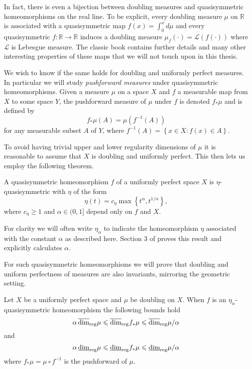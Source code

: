 In fact, there is even a bijection between doubling measures and quasisymmetric homeomorphisms on the real line. To be explicit, every doubling measure $\mu$ on $\mathbb{R}$ is associated with a quasisymmetric map $f(x) = \int_{0}^{x}d\mu$ and every quasisymmetric $f \colon \mathbb{R} \rightarrow \mathbb{R}$ induces a doubling measure $\mu_f( \cdot ) = \mathcal{L}(f(\cdot)) $ where $\mathcal{L}$ is Lebesgue measure. The classic book \cite{heinonen} contains further details and many other interesting properties of these maps that we will not touch upon in this thesis.

We wish to know if the same holds for doubling and uniformly perfect measures. In particular we will study \textit{pushforward measures} under quasisymmetric homeomorphisms. Given a measure $\mu$ on a space $X$ and $f$ a measurable map from $X$ to some space $Y$, the pushforward measure of $\mu$ under $f$ is denoted $f_*\mu$ and is defined by
\[
f_*\mu (A) = \mu(f^{-1}(A))
\]
for any measurable subset $A$ of $Y$, where $f^{-1}(A) = \left\{x \in X \colon f(x) \in A \right\}$. 

To avoid having trivial upper and lower regularity dimensions of $\mu$ it is reasonable to assume that $X$ is doubling and uniformly perfect. This then lets us employ the following theorem. 

\begin{theorem}\label{ch-quantifying:heinonen-quasisymm}
	A quasisymmetric homeomorphism $f$ of a uniformly perfect space $X$ is $\eta$-quasisymmetric with $\eta$ of the form
	\[
	\eta(t) = c_\eta \max\left\{t^\alpha, t^{1/\alpha}\right\},
	\]
	where $c_\eta \ge 1 $ and $\alpha \in (0,1]$ depend only on $f$ and $X$.
\end{theorem}
For clarity we will often write $\eta_{\alpha}$ to indicate the homeomorphism $\eta$ associated with the constant $\alpha$ as described here. Section 3 of \cite{tukia-vaisala} proves this result and explicitly calculates $\alpha$. 

For such quasisymmetric homeomorphisms we will prove that doubling and uniform perfectness of measures are also invariants, mirroring the geometric setting.

\begin{theorem}\label{ch-quantifying:quaisymm-thm}
	Let $X$ be a uniformly perfect space and $\mu$ be doubling on $X$. When $f$ is an $\eta_\alpha$-quasisymmetric homeomorphism the following bounds hold
	\[
	\alpha \, \overline{\dim}_{\textup{reg}} \mu \leqslant \overline{\dim}_{\textup{reg}} f_{*}\mu \leqslant \overline{\dim}_{\textup{reg}} \mu/\alpha
	\]
	and 
	\[
	\alpha \, \underline{\dim}_{\textup{reg}} \mu \leqslant \underline{\dim}_{\textup{reg}} f_{*}\mu \leqslant \underline{\dim}_{\textup{reg}} \mu/\alpha
	\]
	where $f_{*}\mu = \mu \circ f^{-1}$ is the pushforward of $\mu$.
\end{theorem}



